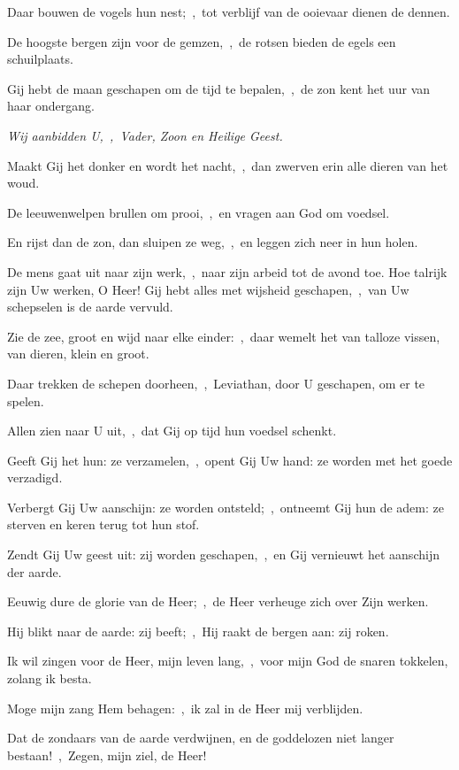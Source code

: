 \documentclass[12pt,twoside,a5paper]{article}
\begin{document}
\begin{halfparskip}
  Daar bouwen de vogels hun nest;~\sep\ tot verblijf van de ooievaar dienen de dennen.

  De hoogste bergen zijn voor de gemzen,~\sep\ de rotsen bieden de egels een schuilplaats.

  Gij hebt de maan geschapen om de tijd te bepalen,~\sep\ de zon kent het uur van haar ondergang.

  \emph{Wij aanbidden U,~\sep\ Vader, Zoon en Heilige Geest.}

  Maakt Gij het donker en wordt het nacht,~\sep\ dan zwerven erin alle dieren van het woud.

  De leeuwenwelpen brullen om prooi,~\sep\ en vragen aan God om voedsel.

  En rijst dan de zon, dan sluipen ze weg,~\sep\ en leggen zich neer in hun holen.

  De mens gaat uit naar zijn werk,~\sep\ naar zijn arbeid tot de avond toe.
  Hoe talrijk zijn Uw werken, O Heer! Gij hebt alles met wijsheid geschapen,~\sep\ van Uw schepselen is de aarde vervuld.

  Zie de zee, groot en wijd naar elke einder:~\sep\ daar wemelt het van talloze vissen, van dieren, klein en groot.

  Daar trekken de schepen doorheen,~\sep\ Leviathan, door U geschapen, om er te spelen.

  Allen zien naar U uit,~\sep\ dat Gij op tijd hun voedsel schenkt.

  Geeft Gij het hun: ze verzamelen,~\sep\ opent Gij Uw hand: ze worden met het goede verzadigd.

  Verbergt Gij Uw aanschijn: ze worden ontsteld;~\sep\ ontneemt Gij hun de adem: ze sterven en keren terug tot hun stof.

  Zendt Gij Uw geest uit: zij worden geschapen,~\sep\ en Gij vernieuwt het aanschijn der aarde.

  Eeuwig dure de glorie van de Heer;~\sep\ de Heer verheuge zich over Zijn werken.

  Hij blikt naar de aarde: zij beeft;~\sep\ Hij raakt de bergen aan: zij roken.

  Ik wil zingen voor de Heer, mijn leven lang,~\sep\ voor mijn God de snaren tokkelen, zolang ik besta.

  Moge mijn zang Hem behagen:~\sep\ ik zal in de Heer mij verblijden.

  Dat de zondaars van de aarde verdwijnen, en de goddelozen niet langer bestaan!~\sep\ Zegen, mijn ziel, de Heer!
\end{halfparskip}
\end{document}
